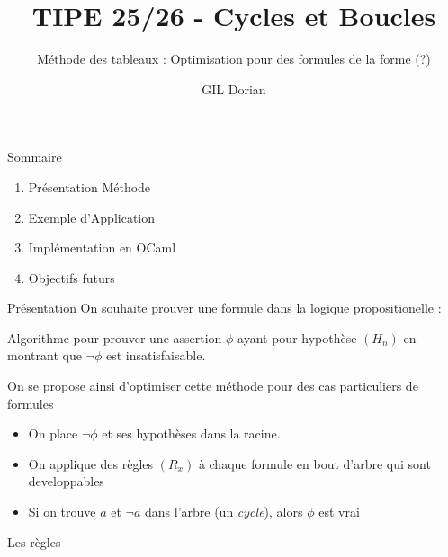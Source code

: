 \documentclass{beamer}
\title{TIPE 25/26 - Cycles et Boucles}
\author{GIL Dorian}
\subtitle{Méthode des tableaux : Optimisation pour des formules de la forme (?)}
\date{}
\begin{document}
\begin{frame}
\titlepage
\end{frame}

\begin{frame}{Sommaire}
\begin{enumerate}
    \item Présentation Méthode
    \item Exemple d'Application
    \item Implémentation en OCaml
    \item Objectifs futurs
\end{enumerate}
\end{frame}

\begin{frame}{Présentation}
    On souhaite prouver une formule dans la logique propositionelle :
    \begin{definition}
        Algorithme pour prouver une assertion $\phi$ ayant pour hypothèse $(H_n)$ en montrant
        que $\lnot \phi$ est insatisfaisable.
    \end{definition}
    On se propose ainsi d'optimiser cette méthode pour des cas particuliers de formules
    \pause
    \begin{itemize}
        \item On place $\lnot\phi$ et ses hypothèses dans la racine.
        \item On applique des règles $(R_x)$ à chaque formule en bout d'arbre qui sont developpables
        \item Si on trouve $a$ et $\lnot a$ dans l'arbre (un \textit{cycle}), alors $\phi$ est vrai
    \end{itemize}
    \pause
    Les règles
\end{frame}
\end{document}
